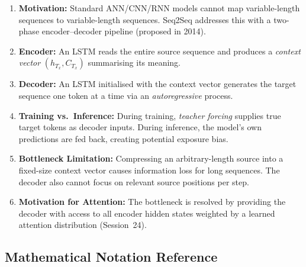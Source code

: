 \documentclass[12pt,a4paper]{article}
\begin{document}
\begin{enumerate}[noitemsep]
  \item \textbf{Motivation:} Standard ANN/CNN/RNN models cannot map variable-length sequences
        to variable-length sequences. Seq2Seq addresses this with a two-phase encoder--decoder
        pipeline (proposed in 2014).

  \item \textbf{Encoder:} An LSTM reads the entire source sequence and produces a
        \emph{context vector} $(h_{T_x}, C_{T_x})$ summarising its meaning.

  \item \textbf{Decoder:} An LSTM initialised with the context vector generates the target
        sequence one token at a time via an \emph{autoregressive} process.

  \item \textbf{Training vs.\ Inference:} During training, \emph{teacher forcing} supplies
        true target tokens as decoder inputs. During inference, the model's own predictions
        are fed back, creating potential exposure bias.

  \item \textbf{Bottleneck Limitation:} Compressing an arbitrary-length source into a
        fixed-size context vector causes information loss for long sequences. The decoder
        also cannot focus on relevant source positions per step.

  \item \textbf{Motivation for Attention:} The bottleneck is resolved by providing the decoder
        with access to all encoder hidden states weighted by a learned attention distribution
        (Session~24).
\end{enumerate}

\subsection{Mathematical Notation Reference}
\end{document}
